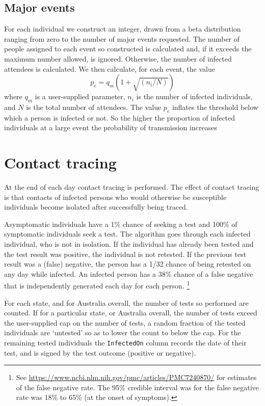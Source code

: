 \documentclass[submission]{grattan}
\newcommand*{\code}[1]{\texttt{#1}}
\begin{document}
\subsection{Major events}
For each individual we construct an integer, drawn from a beta distribution ranging from zero
to the number of major events requested. The number of people assigned to each event so constructed
is calculated and, if it exceeds the maximum number allowed, is ignored. Otherwise, the number of
infected attendees is calculated. We then calculate, for each event, the value
\[p_e = q_m(1 + \sqrt{(n_i / N)}) \]
where \(q_m\) is a user-supplied parameter, \(n_i\) is the number of infected individuals, and \(N\)
is the total number of attendees. The value \(p_e\) inflates the threshold below which a person is infected
or not. So the higher the proportion of infected individuals at a large event the probability of 
transmission increases 

\section{Contact tracing}
At the end of each day contact tracing is performed. 
The effect of contact tracing is that contacts of infected
persons who would otherwise be susceptible 
individuals become isolated after successfully being traced.

Asymptomatic individuals have a 1\% chance of seeking a test and 
100\% of symptomatic individuals seek a test. The algorithm goes
through each infected individual, who is not in isolation. If the individual has already 
been tested and the test result was positive, the individual is not
retested. If the previous test result was a (false) negative, the person
has a 1/32 chance of being retested on any day while infected. 
An infected person has a  38\% chance
of a false negative that is independently generated each day for each person.%
	\footnote{See \url{https://www.ncbi.nlm.nih.gov/pmc/articles/PMC7240870/} for 
	estimates of the false negative rate. The 95\% credible interval was for the false
	negative rate was 18\% to
	65\% (at the onset of symptoms).}


For each state, and for Australia overall, the number of tests so performed
are counted. If for a particular state, or Australia overall,
the number of tests exceed the user-supplied cap on the number
of tests, a random fraction of the tested individuals are `untested' 
so as to lower the count to below the cap. For the remaining tested individuals
the \code{InfectedOn} column records the date of their test, and is signed
by the test outcome (positive or negative).
\end{document}
